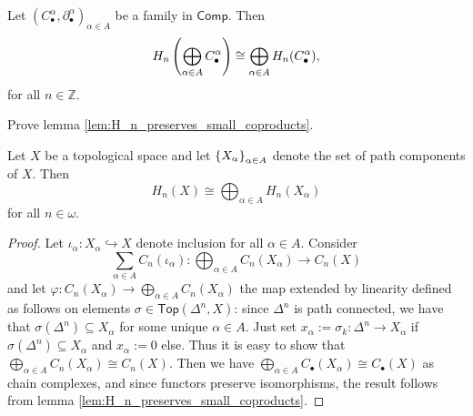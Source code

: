\begin{lemma}
	\label{lem:H_n_preserves_small_coproducts}
	Let $(C_\bullet^\alpha,\partial_\bullet^\alpha)_{\alpha \in A}$ be a family in $\mathsf{Comp}$. Then
	\begin{equation*}
		H_n\del[4]{\bigoplus_{\alpha \in A}C_\bullet^\alpha} \cong \bigoplus_{\alpha \in A}H_n(C_\bullet^\alpha),
	\end{equation*}
	\noindent for all $n \in \mathbb{Z}$.
\end{lemma}

\begin{exercise}
	Prove lemma \ref{lem:H_n_preserves_small_coproducts}.
\end{exercise}

\begin{lemma}
	\label{lem:H_n_direct_sum}
	Let $X$ be a topological space and let $\cbr{X_\alpha}_{\alpha \in A}$ denote the set of path components of $X$. Then
\begin{equation*}
	H_n(X) \cong \bigoplus_{\alpha \in A}H_n(X_\alpha)
\end{equation*}
\noindent for all $n \in \omega$.
\end{lemma}

\begin{proof}
	Let $\iota_\alpha : X_\alpha \hookrightarrow X$ denote inclusion for all $\alpha \in A$. Consider 
	\begin{equation*}
		\sum_{\alpha \in A}C_n(\iota_\alpha) : \bigoplus_{\alpha \in A} C_n(X_\alpha) \to C_n(X)
	\end{equation*}
	\noindent and let $\varphi : C_n(X_\alpha) \to \bigoplus_{\alpha \in A}C_n(X_\alpha)$ the map extended by linearity defined as follows on elements $\sigma \in \mathsf{Top}(\Delta^n,X)$: since $\Delta^n$ is path connected, we have that $\sigma(\Delta^n) \subseteq X_\alpha$ for some unique $\alpha \in A$. Just set $x_\alpha := \sigma_k : \Delta^n \to X_\alpha$ if $\sigma(\Delta^n) \subseteq X_\alpha$ and $x_\alpha := 0$ else. Thus it is easy to show that $\bigoplus_{\alpha \in A}C_n(X_\alpha) \cong C_n(X)$. Then we have $\bigoplus_{\alpha \in A}C_\bullet(X_\alpha) \cong C_\bullet(X)$ as chain complexes, and since functors preserve isomorphisms, the result follows from lemma \ref{lem:H_n_preserves_small_coproducts}.
\end{proof}
